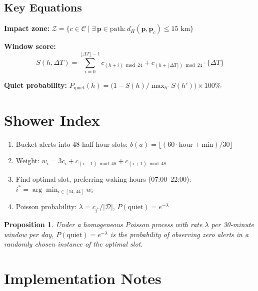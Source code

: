 \documentclass[12pt,a4paper]{article}
\newtheorem{proposition}{Proposition}
\begin{document}
\subsection{Key Equations}

\textbf{Impact zone:}
$\mathcal{Z}=\{c\in\mathcal{C}\mid\exists\,\mathbf{p}\in\text{path}:d_H(\mathbf{p},\mathbf{p}_c)\leq15\text{ km}\}$

\textbf{Window score:}
\begin{equation}
  S(h,\Delta T)=\sum_{i=0}^{\lfloor\Delta T\rfloor-1}c_{(h+i)\bmod 24}
  +c_{(h+\lfloor\Delta T\rfloor)\bmod 24}\cdot\{\Delta T\}
  \label{eq:window}
\end{equation}

\textbf{Quiet probability:}
$P_{\text{quiet}}(h)=\bigl(1-S(h)/\max_{h'}S(h')\bigr)\times100\%$

\section{Shower Index}
\label{sec:shower}

\begin{enumerate}
  \item Bucket alerts into 48 half-hour slots:
        $b(a)=\lfloor(60\cdot\text{hour}+\text{min})/30\rfloor$
  \item Weight: $w_i=3c_i+c_{(i-1)\bmod48}+c_{(i+1)\bmod48}$
  \item Find optimal slot, preferring waking hours (07:00--22:00):
        $i^*=\arg\min_{i\in[14,44]}w_i$
  \item Poisson probability: $\lambda=c_{i^*}/|\mathcal{D}|$,\;
        $P(\text{quiet})=e^{-\lambda}$
\end{enumerate}

\begin{proposition}
Under a homogeneous Poisson process with rate $\lambda$ per 30-minute window per
day, $P(\text{quiet})=e^{-\lambda}$ is the probability of observing zero alerts in
a randomly chosen instance of the optimal slot.
\end{proposition}

\section{Implementation Notes}
\label{sec:implementation}
\end{document}
